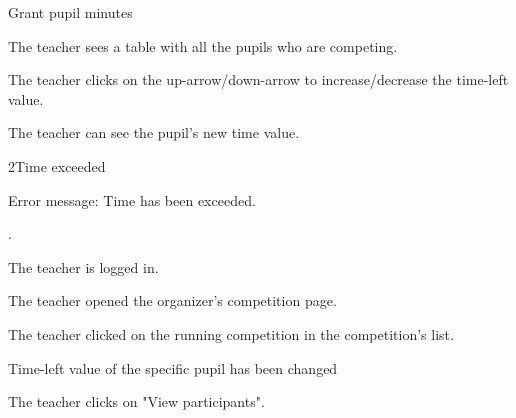 \begin{uc}{Grant pupil minutes}

    \begin{uc-mss}
    \item The teacher sees a table with all the pupils who are competing.
    \item The teacher clicks on the up-arrow/down-arrow to increase/decrease the time-left value.
    \item The teacher can see the pupil's new time value.
    \end{uc-mss}

    \begin{uc-ext}

        \begin{uc-fail}{2}{Time exceeded}
        \item Error message: Time has been exceeded.
        \item {}.
        \end{uc-fail}

    \end{uc-ext}

    \begin{uc-pre}
        \item The teacher is logged in.
        \item The teacher opened the organizer's competition page.
    \item The teacher clicked on the running competition in the competition's list.
    \end{uc-pre}

    \begin{uc-post}
    \item Time-left value of the specific pupil has been changed
    \end{uc-post}

    \begin{uc-trig}
        The teacher clicks on "View participants".
    \end{uc-trig}

\end{uc}
